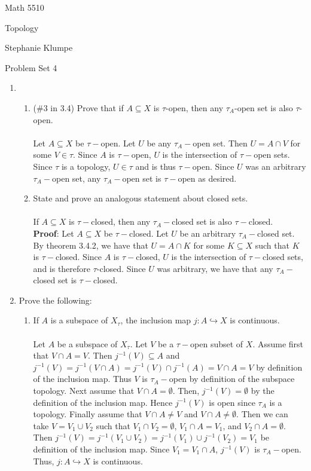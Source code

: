 \documentclass[12pt]{article}
\begin{document}
\noindent Math 5510

\noindent Topology

\noindent Stephanie Klumpe

\vspace{.2in}
\begin{center}
Problem Set 4
\end{center}

 \begin{enumerate}%
\item \begin{enumerate}\item(\#3 in 3.4) Prove that if $A\subseteq X$ is $\tau$-open, then any $\tau_{A}$-open set is also $\tau$-open.\\\\
Let $A\subseteq X$ be $\tau-$open. Let $U$ be any $\tau_{A}-$open set. Then $U=A\cap V$ for some $V\in\tau$. Since $A$ is $\tau-$open, $U$ is the intersection of $\tau-$open sets. Since $\tau$ is a topology, $U\in\tau$ and is thus $\tau-$open. Since $U$ was an arbitrary $\tau_{A}-$open set, any $\tau_{A}-$open set is $\tau-$open as desired.\\[20pt]

\item State and prove an analogous statement about closed sets.\\\\
If $A\subseteq X$ is $\tau-$closed, then any $\tau_{A}-$closed set is also $\tau-$closed.\\
\textbf{Proof}: Let $A\subseteq X$ be $\tau-$closed. Let $U$ be an arbitrary $\tau_{A}-$closed set. By theorem 3.4.2, we have that $U=A\cap K$ for some $K\subseteq X$ such that $K$ is $\tau-$closed. Since $A$ is $\tau-$closed, $U$ is the intersection of $\tau-$closed sets, and is therefore $\tau$-closed. Since $U$ was arbitrary, we have that any $\tau_{A}-$closed set is $\tau-$closed.\\[20pt]
\end{enumerate}
\item Prove the following:
\begin{enumerate}
\item If $A$ is a subspace of $X_{\tau}$, the inclusion map $j:A\hookrightarrow X$ is continuous.\\\\
Let $A$ be a subspace of $X_{\tau}$. Let $V$ be a $\tau-$open subset of $X$. Assume first that $V\cap A=V$. Then $j^{-1}(V)\subseteq A$ and $j^{-1}(V)=j^{-1}(V\cap A)=j^{-1}(V)\cap j^{-1}(A)=V\cap A=V$ by definition of the inclusion map. Thus $V$ is $\tau_{A}-$open by definition of the subspace topology. Next assume that $V\cap A=\emptyset$. Then, $j^{-1}(V)=\emptyset$ by the definition of the inclusion map. Hence $j^{-1}(V)$ is open since $\tau_{A}$ is a topology. Finally assume that $V\cap A\neq V$ and $V\cap A\neq\emptyset$. Then we can take $V=V_1\cup V_2$ such that $V_1\cap V_2=\emptyset$, $V_1\cap A=V_1$, and $V_2\cap A=\emptyset$. Then $j^{-1}(V)=j^{-1}(V_1\cup V_2)=j^{-1}(V_1)\cup j^{-1}(V_2)=V_1$ be definition of the inclusion map. Since $V_1=V_1\cap A$, $j^{-1}(V)$ is $\tau_{A}-$open. Thus, $j:A\hookrightarrow X$ is continuous.\\[20pt]


\end{enumerate}
\end{enumerate}
\end{document}
